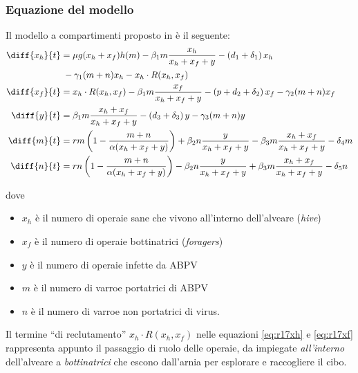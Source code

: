 \documentclass[11pt,a4paper]{book} %
\begin{document}
\subsubsection{Equazione del modello}
Il modello a compartimenti proposto in \cite{ratti2017} è il seguente:
\begin{align}
    \diff{x_h}{t} &= \mu g( x_h + x_f ) h(m) - \beta_1 m \frac{x_h}{x_h + x_f + y} - \left( d_1 + \delta_1 \right) x_h \notag \\ %
    \label{eq:r17xh}
        &{\;} - \gamma_1 (m+n) x_h - x_h \cdot R(x_h, x_f) \\ %
    \label{eq:r17xf}
    \diff{x_f}{t} &= x_h \cdot R(x_h, x_f) - \beta_1 m \frac{x_f}{x_h + x_f + y}
    - \left( p + d_2 + \delta_2 \right) x_f - \gamma_2 (m+n) x_f \\
    \label{eq:r17y}
    \diff{y}{t} &= \beta_1 m \frac{x_h + x_f}{x_h + x_f + y} - \left( d_3 + \delta_3 \right) y - \gamma_3 (m+n) y \\
    \label{eq:r17m}
    \diff{m}{t} &= rm \left( 1 - \frac{m+n}{ \alpha (x_h + x_f + y) } \right) + \beta_2 n \frac{y}{x_h + x_f + y}
    - \beta_3 m \frac{x_h + x_f}{x_h + x_f + y} - \delta_4 m \\
    \label{eq:r17n}
    \diff{n}{t} &= rn \left( 1 - \frac{m+n}{ \alpha (x_h + x_f + y) } \right) - \beta_2 n \frac{y}{x_h + x_f + y}
    + \beta_3 m \frac{x_h + x_f}{x_h + x_f + y} - \delta_5 n
\end{align}

dove
\begin{itemize}
    \item $x_h$ è il numero di operaie sane che vivono all'interno dell'alveare (\emph{hive})
    \item $x_f$ è il numero di operaie bottinatrici (\emph{foragers})
    \item $y$ è il numero di operaie infette da ABPV
    \item $m$ è il numero di varroe portatrici di ABPV
    \item $n$ è il numero di varroe non portatrici di virus.
\end{itemize}


Il termine ``di reclutamento'' $x_h \cdot R(x_h, x_f)$ nelle equazioni \ref{eq:r17xh} e \ref{eq:r17xf} rappresenta appunto il passaggio di ruolo delle operaie, da impiegate \emph{all'interno} dell'alveare a \emph{bottinatrici} che escono dall'arnia per esplorare e raccogliere il cibo.
\end{document}
